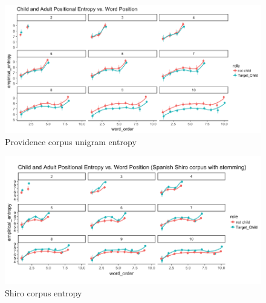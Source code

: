 \documentclass[10pt, letterpaper]{article}
\newenvironment{CodeChunk}{}{}
\begin{document}
\begin{CodeChunk}
\begin{figure}[h]

{\centering \includegraphics{figs/providence_PE-1} 

}

\caption[Providence corpus unigram entropy]{Providence corpus unigram entropy}\label{fig:providence_PE}
\end{figure}
\end{CodeChunk}

\begin{CodeChunk}
\begin{figure}[h]

{\centering \includegraphics{figs/shiro_PE-1} 

}

\caption[Shiro corpus entropy]{Shiro corpus entropy}\label{fig:shiro_PE}
\end{figure}
\end{CodeChunk}
\end{document}
